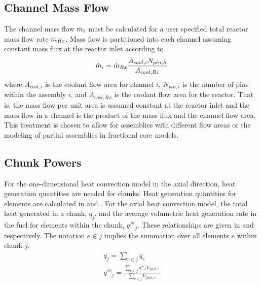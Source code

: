   \subsection{Channel Mass Flow}
    The channel mass flow $\dot{m}_i$ must be calculated for a user 
    specified total reactor mass flow rate $\dot{m}_{Rx}$.  Mass flow is 
    partitioned into each channel assuming constant mass flux at the reactor 
    inlet according to 
    \begin{equation}
      \label{eq:mass_flow_split}
      \dot{m}_i = \dot{m}_{Rx} \frac{A_{cool,i}N_{pin,h}}{A_{cool,Rx}}
    \end{equation}
    where $A_{cool,i}$ is the coolant flow area for channel $i$, $N_{pin,i}$ is
    the number of pins within the assembly $i$, and $A_{cool,Rx}$
    is the coolant flow area for the reactor.  That is, the mass 
    flow per unit area is assumed constant at the reactor inlet and the mass
    flow in a channel is the product of the mass flux and the channel flow area.
    This treatment is chosen to allow for assemblies with different flow areas
    or the modeling of partial assemblies in fractional core models.

  \subsection{Chunk Powers}
    For the one-dimensional heat convection model in the axial direction,
    heat generation quantities are needed for chunks. Heat generation quantities
    for elements are calculated in  and
    .
    For the axial heat convection model, the total heat generated in a chunk,
    $q_j$, and the average volumetric heat generation rate in the fuel for
    elements within the chunk, $q'''_j$. 
    These relationships are given in  and
     respectively. The notation $e \in j$ implies the
    summation over all elements $e$ within chunk $j$.
    \begin{align}
      \label{eq:chunkpwr}
      q_j = \sum_{e \in j} q_e \\
      \label{eq:chunkqppp_fuel}
      q'''_j = \frac{\sum_{e \in j} q'''_e V_{fuel,e}}{\sum_{e \in j} 
        V_{fuel,e}}
    \end{align}
  
